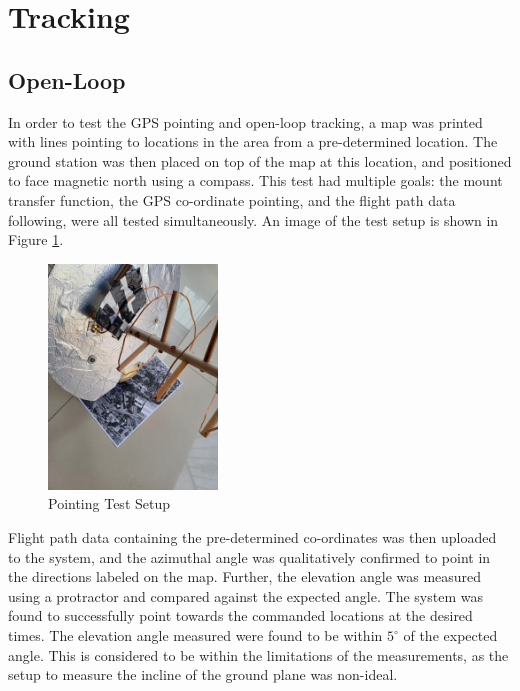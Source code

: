 \graphicspath{{./figures}}

\section{Tracking}

\subsection{Open-Loop}

In order to test the GPS pointing and open-loop tracking, a map was printed with lines pointing to locations in the area from a pre-determined location. The ground station was then placed on top of the map at this location, and positioned to face magnetic north using a compass. This test had multiple goals: the mount transfer function, the GPS co-ordinate pointing, and the flight path data following, were all tested simultaneously. An image of the test setup is shown in Figure \ref{fig:pointingTest}.

\begin{figure}[!htb]
  \centering
  \includegraphics[width=0.4\textwidth]{pointingTestSetup}
  \caption{Pointing Test Setup}
  \label{fig:pointingTest}
\end{figure}

Flight path data containing the pre-determined co-ordinates was then uploaded to the system, and the azimuthal angle was qualitatively confirmed to point in the directions labeled on the map. Further, the elevation angle was measured using a protractor and compared against the expected angle. The system was found to successfully point towards the commanded locations at the desired times. The elevation angle measured were found to be within $5^\circ$ of the expected angle. This is considered to be within the limitations of the measurements, as the setup to measure the incline of the ground plane was non-ideal.

